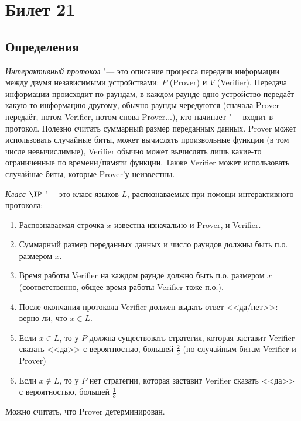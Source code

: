 \setcounter{section}{20}
\section{Билет 21}
\subsection{Определения}
	\begin{Def}
		\textit{Интерактивный протокол} "--- это описание процесса передачи информации между двумя независимыми устройствами: $P$ (Prover) и $V$ (Verifier).
		Передача информации происходит по раундам, в каждом раунде одно устройство передаёт какую-то информацию другому, обычно раунды чередуются
		(сначала Prover передаёт, потом Verifier, потом снова Prover...), кто начинает "--- входит в протокол.
		Полезно считать суммарный размер переданных данных.
		Prover может использовать случайные биты, может вычислять произвольные функции (в том числе невычислимые), Verifier обычно может вычислять лишь какие-то ограниченные по времени/памяти функции.
		Также Verifier может использовать случайные биты, которые Prover'у неизвестны.
	\end{Def}
	\begin{Def}
		\textit{Класс $\IP$} "--- это класс языков $L$, распознаваемых при помощи интерактивного протокола:
		\begin{enumerate}
			\item Распознаваемая строчка $x$ известна изначально и Prover, и Verifier.
			\item Суммарный размер переданных данных и число раундов должны быть п.о. размером $x$.
			\item Время работы Verifier на каждом раунде должно быть п.о. размером $x$ (соответственно, общее время работы Verifier тоже п.о.).
			\item После окончания протокола Verifier должен выдать ответ <<да/нет>>: верно ли, что $x \in L$.
			\item Если $x \in L$, то у $P$ должна существовать стратегия, которая заставит Verifier сказать <<да>> с вероятностью, большей $\frac 23$ (по случайным битам Verifier и Prover)
			\item Если $x \notin L$, то у $P$ нет стратегии, которая заставит Verifier сказать <<да>> с вероятностью, большей $\frac 13$
		\end{enumerate}
	\end{Def}
	\begin{assertion}
		Можно считать, что Prover детерминирован.
	\end{assertion}
